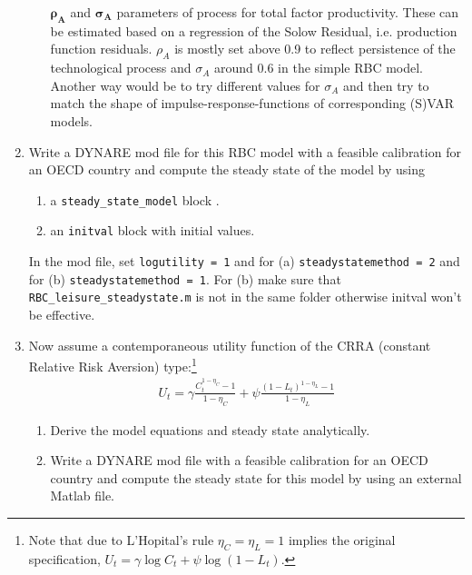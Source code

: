\documentclass[a4paper]{scrartcl}
\begin{document}
\begin{enumerate}
\begin{solution}
\begin{itemize}
			\item[$\boldsymbol{\rho_A}$ and $\boldsymbol{\sigma_A}$] parameters of process for total factor productivity. These can be estimated based on a regression of the Solow Residual, i.e. production function residuals. $\rho_A$ is mostly set above 0.9 to reflect persistence of the technological process and $\sigma_A$ around $0.6$ in the simple RBC model. Another way would be to try different values for $\sigma_A$ and then try to match the shape of impulse-response-functions of corresponding (S)VAR models.
		\end{itemize}
		\end{solution}
		\item Write a DYNARE mod file for this RBC model with a feasible calibration for an OECD country and compute the steady state of the model by using
		\begin{enumerate}
			\item a \texttt{steady\_state\_model} block .
			\item an \texttt{initval} block with initial values.
		\end{enumerate}
		\begin{solution}
		In the mod file, set \texttt{logutility = 1} and for (a) \texttt{steadystatemethod = 2} and for (b) \texttt{steadystatemethod = 1}. For (b) make sure that \texttt{RBC\_leisure\_steadystate.m} is not in the same folder otherwise initval won't be effective.
		\end{solution}
	\item Now assume a contemporaneous utility function of the CRRA (constant Relative Risk Aversion) type:\footnote{Note that due to L'Hopital's rule $\eta_C=\eta_L=1$ implies the original specification, $U_t=\gamma \log C_t + \psi \log(1-L_t)$.}
	\begin{align*}
		U_t = \gamma \frac{C_{t}^{1-\eta_C}-1}{1-\eta_C} +\psi \frac{(1-L_{t})^{1-\eta_L}-1}{1-\eta_L}
	\end{align*}
	\begin{enumerate}
		\item Derive the model equations and steady state analytically.
		\item Write a DYNARE mod file with a feasible calibration for an OECD country and compute the steady state for this model by using an external Matlab file.
	\end{enumerate}
	 

\end{enumerate}
\end{document}
